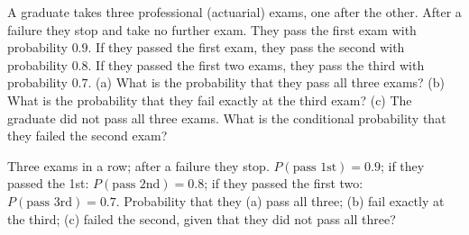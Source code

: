 
\begin{problem}
	A graduate takes three professional (actuarial) exams, one after the other.
	After a failure they stop and take no further exam. They pass the first
	exam with probability $0.9$. If they passed the first exam, they pass the
	second with probability $0.8$. If they passed the first two exams, they pass
	the third with probability $0.7$.
	(a) What is the probability that they pass all three exams?
	(b) What is the probability that they fail exactly at the third exam?
	(c) The graduate did not pass all three exams. What is the conditional
	probability that they failed the second exam?
\end{problem}

\begin{slideproblem}
	Three exams in a row; after a failure they stop. $P(\text{pass 1st})=0.9$;
	if they passed the 1st: $P(\text{pass 2nd})=0.8$; if they passed the first
	two: $P(\text{pass 3rd})=0.7$. Probability that they (a) pass all three;
	(b) fail exactly at the third; (c) failed the second, given that they did
	not pass all three?
\end{slideproblem}

